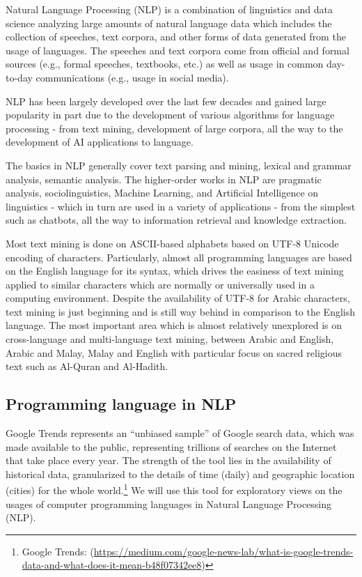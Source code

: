 \documentclass[
]{article}
\begin{document}
Natural Language Processing (NLP) is a combination of linguistics and data science analyzing large amounts of natural language data which includes the collection of speeches, text corpora, and other forms of data generated from the usage of languages. The speeches and text corpora come from official and formal sources (e.g., formal speeches, textbooks, etc.) as well as usage in common day-to-day communications (e.g., usage in social media).

NLP has been largely developed over the last few decades and gained large popularity in part due to the development of various algorithms for language processing - from text mining, development of large corpora, all the way to the development of AI applications to language.

The basics in NLP generally cover text parsing and mining, lexical and grammar analysis, semantic analysis. The higher-order works in NLP are pragmatic analysis, sociolinguistics, Machine Learning, and Artificial Intelligence on linguistics - which in turn are used in a variety of applications - from the simplest such as chatbots, all the way to information retrieval and knowledge extraction.

Most text mining is done on ASCII-based alphabets based on UTF-8 Unicode encoding of characters. Particularly, almost all programming languages are based on the English language for its syntax, which drives the easiness of text mining applied to similar characters which are normally or universally used in a computing environment. Despite the availability of UTF-8 for Arabic characters, text mining is just beginning and is still way behind in comparison to the English language. The most important area which is almost relatively unexplored is on cross-language and multi-language text mining, between Arabic and English, Arabic and Malay, Malay and English with particular focus on sacred religious text such as Al-Quran and Al-Hadith.

\hypertarget{programming-language-in-NLP}{%
\subsection{Programming language in NLP}\label{programming-language-in-NLP}}

Google Trends represents an ``unbiased sample'' of Google search data, which was made available to the public, representing trillions of searches on the Internet that take place every year. The strength of the tool lies in the availability of historical data, granularized to the details of time (daily) and geographic location (cities) for the whole world.\footnote{Google Trends: (\url{https://medium.com/google-news-lab/what-is-google-trends-data-and-what-does-it-mean-b48f07342ee8})} We will use this tool for exploratory views on the usages of computer programming languages in Natural Language Processing (NLP).
\end{document}

